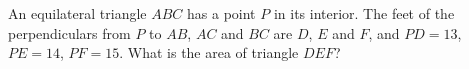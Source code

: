 An equilateral triangle $ABC$ has a point $P$ in its interior. The feet of the perpendiculars from $P$ to $AB$, $AC$ and $BC$ are $D$, $E$ and $F$, and $PD=13$, $PE=14$, $PF=15$. What is the area of triangle $DEF$?
